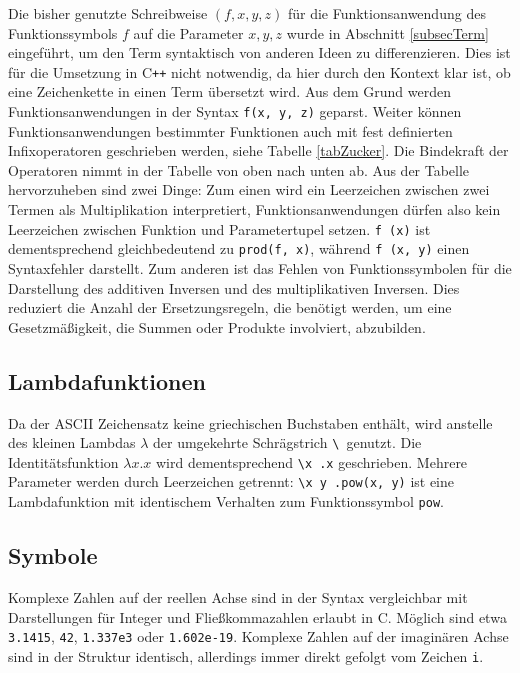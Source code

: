 Die bisher genutzte Schreibweise $(f, x, y, z)$ für die Funktionsanwendung des Funktionssymbols $f$ auf die Parameter $x, y, z$ wurde in Abschnitt \ref{subsecTerm} eingeführt, um den Term syntaktisch von anderen Ideen zu differenzieren. Dies ist für die Umsetzung in C\texttt{++} nicht notwendig, da hier durch den Kontext klar ist, ob eine Zeichenkette in einen Term übersetzt wird. Aus dem Grund werden Funktionsanwendungen in der Syntax \verb|f(x, y, z)| geparst. 
Weiter können Funktionsanwendungen bestimmter Funktionen auch mit fest definierten Infixoperatoren geschrieben werden, siehe Tabelle \ref{tabZucker}. Die Bindekraft der Operatoren nimmt in der Tabelle von oben nach unten ab.
Aus der Tabelle hervorzuheben sind zwei Dinge: Zum einen wird ein Leerzeichen zwischen zwei Termen als Multiplikation interpretiert, Funktionsanwendungen dürfen also kein Leerzeichen zwischen Funktion und Parametertupel setzen. \verb|f (x)| ist dementsprechend gleichbedeutend zu \verb|prod(f, x)|, während \verb|f (x, y)| einen Syntaxfehler darstellt. Zum anderen ist das Fehlen von Funktionssymbolen für die Darstellung des additiven Inversen und des multiplikativen Inversen. Dies reduziert die Anzahl der Ersetzungsregeln, die benötigt werden, um eine Gesetzmäßigkeit, die Summen oder Produkte involviert, abzubilden. 

\subsection{Lambdafunktionen} \label{subsubsecLambdaSyntax}
Da der ASCII Zeichensatz keine griechischen Buchstaben enthält, wird anstelle des kleinen Lambdas $\lambda$ der umgekehrte Schrägstrich \verb~\ ~genutzt. Die Identitätsfunktion $\lambda x.x$ wird dementsprechend \verb~\x .x~ geschrieben. Mehrere Parameter werden durch Leerzeichen getrennt: \verb~\x y .pow(x, y)~ ist eine Lambdafunktion mit identischem Verhalten zum Funktionssymbol \verb|pow|.

\subsection{Symbole}
Komplexe Zahlen auf der reellen Achse sind in der Syntax vergleichbar mit Darstellungen für Integer und Fließkommazahlen erlaubt in C. Möglich sind etwa \verb|3.1415|, \verb|42|, \verb|1.337e3| oder \verb|1.602e-19|. Komplexe Zahlen auf der imaginären Achse sind in der Struktur identisch, allerdings immer direkt gefolgt vom Zeichen \verb|i|. 

